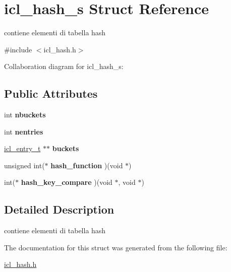 \hypertarget{structicl__hash__s}{}\section{icl\+\_\+hash\+\_\+s Struct Reference}
\label{structicl__hash__s}


contiene elementi di tabella hash  




{\ttfamily \#include $<$icl\+\_\+hash.\+h$>$}



Collaboration diagram for icl\+\_\+hash\+\_\+s\+:
\subsection*{Public Attributes}
\begin{DoxyCompactItemize}
\item 
int {\bfseries nbuckets}\hypertarget{structicl__hash__s_a18d5f1bc101356322a4db7a6cfeb9f7e}{}\label{structicl__hash__s_a18d5f1bc101356322a4db7a6cfeb9f7e}

\item 
int {\bfseries nentries}\hypertarget{structicl__hash__s_a7654114080ad222e0b8c2311ef3466fa}{}\label{structicl__hash__s_a7654114080ad222e0b8c2311ef3466fa}

\item 
\hyperlink{structicl__entry__s}{icl\+\_\+entry\+\_\+t} $\ast$$\ast$ {\bfseries buckets}\hypertarget{structicl__hash__s_a8d8b17cad1aca47e27486e4f49882df4}{}\label{structicl__hash__s_a8d8b17cad1aca47e27486e4f49882df4}

\item 
unsigned int($\ast$ {\bfseries hash\+\_\+function} )(void $\ast$)\hypertarget{structicl__hash__s_a06d96a5a8f9015e2ee6d6bf2e0876971}{}\label{structicl__hash__s_a06d96a5a8f9015e2ee6d6bf2e0876971}

\item 
int($\ast$ {\bfseries hash\+\_\+key\+\_\+compare} )(void $\ast$, void $\ast$)\hypertarget{structicl__hash__s_a6e3fc8d3a066a9c8fd5f45161119874e}{}\label{structicl__hash__s_a6e3fc8d3a066a9c8fd5f45161119874e}

\end{DoxyCompactItemize}


\subsection{Detailed Description}
contiene elementi di tabella hash 

The documentation for this struct was generated from the following file\+:\begin{DoxyCompactItemize}
\item 
\hyperlink{icl__hash_8h}{icl\+\_\+hash.\+h}\end{DoxyCompactItemize}
